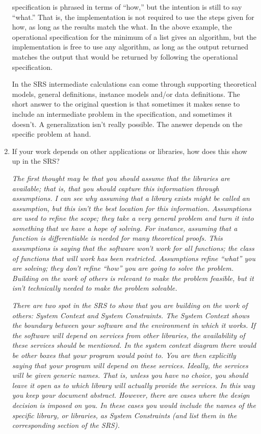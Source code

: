 \documentclass[12pt]{article}
\begin{document}
\begin{enumerate}
{\begin{enumerate}
        specification is phrased in terms of ``how,'' but the
        intention is still to
        say ``what.'' That is, the implementation is not required to
        use the steps
        given for how, as long as the results match the what.  In the above
        example, the operational specification for the minimum of a
        list gives an
        algorithm, but the implementation is free to use any
        algorithm, as long as
        the output returned matches the output that would be returned
        by following
        the operational specification.
    \end{enumerate}
    In the SRS intermediate calculations can come through supporting theoretical
    models, general definitions, instance models and/or data definitions.  The
    short answer to the original question is that sometimes it makes sense to
    include an intermediate problem in the specification, and sometimes it
    doesn't.  A generalization isn't really possible.  The answer depends on the
  specific problem at hand. \smallskip}

\item If your work depends on other applications or libraries, how does this
  show up in the SRS? \medskip

  \emph{The first thought may be that you should assume that the libraries are
    available; that is, that you should capture this information through
    assumptions.  I can see why assuming that a library exists might be called
    an assumption, but this isn't the best location for this information.
    Assumptions are used to refine the scope; they take a very general problem
    and turn it into something that we have a hope of solving.  For instance,
    assuming that a function is differentiable is needed for many theoretical
    proofs.  This assumptions is saying that the software won't work for all
    functions; the class of functions that will work has been restricted.
    Assumptions refine ``what'' you are solving; they don't refine ``how'' you
    are going to solve the problem.  Building on the work of others is relevant
    to make the problem feasible, but it isn't technically needed to make the
  problem solvable.}

  \emph{There are two spot in the SRS to show that you are building on the work
    of others: System Context and System Constraints.  The System Context shows
    the boundary between your software and the environment in which it works.
    If the software will depend on services from other libraries, the
    availability of these services should be mentioned.  In the system context
    diagram there would be other boxes that your program would point to.  You
    are then explicitly saying that your program will depend on these services.
    Ideally, the services will be given generic names.  That is, unless you have
    no choice, you should leave it open as to which library will actually
    provide the services.  In this way you keep your document abstract.
    However, there are cases where the design decision is imposed on you.  In
    these cases you would include the names of the specific library, or
    libraries, as System Constraints (and list them in the corresponding section
  of the SRS).}


\end{enumerate}
\end{document}
